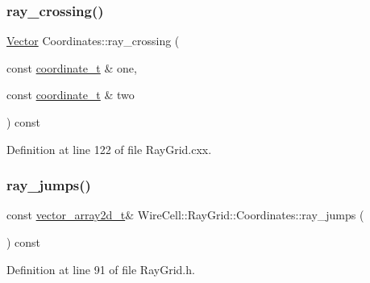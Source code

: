 \subsubsection{\texorpdfstring{ray\+\_\+crossing()}{ray\_crossing()}}
{\footnotesize\ttfamily \hyperlink{namespace_wire_cell_aa3c82d3ba85f032b0d278b7004846800}{Vector} Coordinates\+::ray\+\_\+crossing (\begin{DoxyParamCaption}\item[{const \hyperlink{struct_wire_cell_1_1_ray_grid_1_1coordinate__t}{coordinate\+\_\+t} \&}]{one,  }\item[{const \hyperlink{struct_wire_cell_1_1_ray_grid_1_1coordinate__t}{coordinate\+\_\+t} \&}]{two }\end{DoxyParamCaption}) const}



Definition at line 122 of file Ray\+Grid.\+cxx.

\mbox{\label{class_wire_cell_1_1_ray_grid_1_1_coordinates_aba3b976c309d9e8010104d007674a0b7}} 
\subsubsection{\texorpdfstring{ray\+\_\+jumps()}{ray\_jumps()}}
{\footnotesize\ttfamily const \hyperlink{namespace_wire_cell_1_1_ray_grid_a5fe54fc4af050aa1782db6b9761df515}{vector\+\_\+array2d\+\_\+t}\& Wire\+Cell\+::\+Ray\+Grid\+::\+Coordinates\+::ray\+\_\+jumps (\begin{DoxyParamCaption}{ }\end{DoxyParamCaption}) const\hspace{0.3cm}{\ttfamily [inline]}}



Definition at line 91 of file Ray\+Grid.\+h.

\mbox{\label{class_wire_cell_1_1_ray_grid_1_1_coordinates_ae0f4aa61c56a31334041565b3defdf6f}} 
